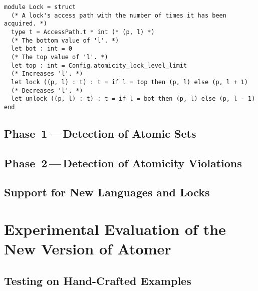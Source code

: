 \begin{lstlisting}[style=ocaml, label={list:lockModule}, float=hbt, caption={The implementation of a~module that represents \emph{locks in abstract states}}]
module Lock = struct
  (* A lock's access path with the number of times it has been acquired. *)
  type t = AccessPath.t * int (* (p, l) *)
  (* The bottom value of 'l'. *)
  let bot : int = 0
  (* The top value of 'l'. *)
  let top : int = Config.atomicity_lock_level_limit
  (* Increases 'l'. *)
  let lock ((p, l) : t) : t = if l = top then (p, l) else (p, l + 1)
  (* Decreases 'l'. *)
  let unlock ((p, l) : t) : t = if l = bot then (p, l) else (p, l - 1)
end
\end{lstlisting}


\section{\texorpdfstring{Phase~1\,---\,Detection of Atomic Sets}{Phase~1 - Detection of Atomic Sets}}
\label{sec:implementPhase1}


\section{\texorpdfstring{Phase~2\,---\,Detection of Atomicity Violations}{Phase~2 - Detection of Atomicity Violations}}
\label{sec:implementPhase2}


\section{Support for New Languages and Locks}
\label{sec:implementLanguages}







\chapter{Experimental Evaluation of the New Version of Atomer}
\label{chap:exp}

\cite{deadlockKroening}


\section{Testing on Hand-Crafted Examples}
\label{sec:expHand}


